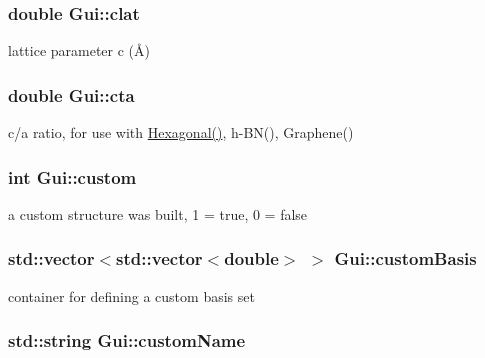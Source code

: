 \subsubsection[{clat}]{\setlength{\rightskip}{0pt plus 5cm}double Gui\+::clat}\label{class_gui_ac92e0603324d6b978d1813d0d0c2bef9}


lattice parameter c (Å) 

\hypertarget{class_gui_a105eb1ab34dee685c11005e47c44ee16}{}
\subsubsection[{cta}]{\setlength{\rightskip}{0pt plus 5cm}double Gui\+::cta}\label{class_gui_a105eb1ab34dee685c11005e47c44ee16}


c/a ratio, for use with \hyperlink{class_hexagonal}{Hexagonal()}, h-\/\+B\+N(), Graphene() 

\hypertarget{class_gui_aedb074749fe28d1c9b11b5200017b1a7}{}
\subsubsection[{custom}]{\setlength{\rightskip}{0pt plus 5cm}int Gui\+::custom}\label{class_gui_aedb074749fe28d1c9b11b5200017b1a7}


a custom structure was built, 1 = true, 0 = false 

\hypertarget{class_gui_a0ba23b6cdb6a13e279ebb07098e265b5}{}
\subsubsection[{custom\+Basis}]{\setlength{\rightskip}{0pt plus 5cm}std\+::vector$<$std\+::vector$<$double$>$ $>$ Gui\+::custom\+Basis}\label{class_gui_a0ba23b6cdb6a13e279ebb07098e265b5}


container for defining a custom basis set 

\hypertarget{class_gui_a062cae171eaf8234689de5fe473692e3}{}
\subsubsection[{custom\+Name}]{\setlength{\rightskip}{0pt plus 5cm}std\+::string Gui\+::custom\+Name}\label{class_gui_a062cae171eaf8234689de5fe473692e3}



